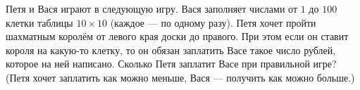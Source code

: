 Петя и Вася играют в следующую игру. Вася заполняет числами от $1$ до $100$ клетки таблицы $10 \times 10$ (каждое --- по одному разу). Петя хочет пройти шахматным королём от левого края доски до правого. При этом если он ставит короля на какую-то клетку, то он обязан заплатить Васе такое число рублей, которое на ней написано. Сколько Петя заплатит Васе при правильной игре? (Петя хочет заплатить как можно меньше, Вася --- получить как можно больше.)
